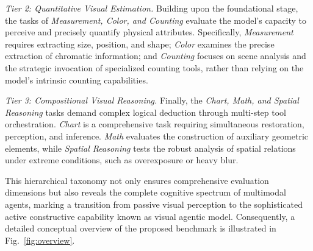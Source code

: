 \documentclass[runningheads]{llncs}
\begin{document}
    \textit{Tier 2: Quantitative Visual Estimation.} Building upon the foundational stage, the tasks of \textit{Measurement, Color, and Counting} evaluate the model's capacity to perceive and precisely quantify physical attributes. Specifically, \textit{Measurement} requires extracting size, position, and shape; \textit{Color} examines the precise extraction of chromatic information; and \textit{Counting} focuses on scene analysis and the strategic invocation of specialized counting tools, rather than relying on the model's intrinsic counting capabilities.
    
    \textit{Tier 3: Compositional Visual Reasoning.} Finally, the \textit{Chart, Math, and Spatial Reasoning} tasks demand complex logical deduction through multi-step tool orchestration. \textit{Chart} is a comprehensive task requiring simultaneous restoration, perception, and inference. \textit{Math} evaluates the construction of auxiliary geometric elements, while \textit{Spatial Reasoning} tests the robust analysis of spatial relations under extreme conditions, such as overexposure or heavy blur.


This hierarchical taxonomy not only ensures comprehensive evaluation dimensions but also reveals the complete cognitive spectrum of multimodal agents, marking a transition from passive visual perception to the sophisticated active constructive capability known as visual agentic model. Consequently, a detailed conceptual overview of the proposed benchmark is illustrated in Fig.~\ref{fig:overview}.
\end{document}
